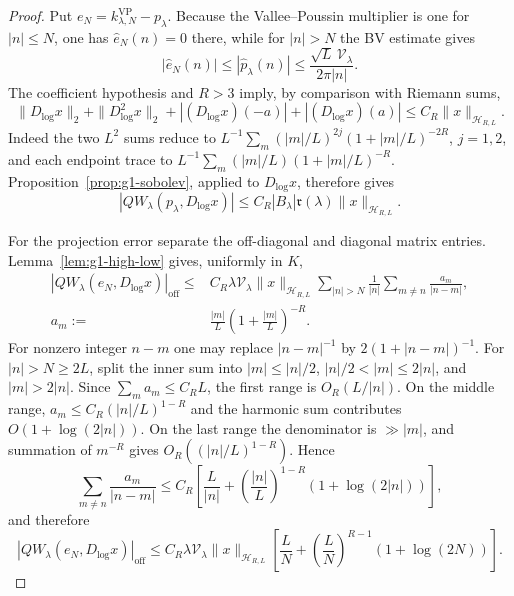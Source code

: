 \documentclass[11pt]{article}
\theoremstyle{remark}
\begin{document}
\begin{proof}
Put $e_N=k^{\mathrm{VP}}_{\lambda,N}-p_\lambda$.  Because the
Vallee--Poussin multiplier is one for $|n|\le N$, one has
$\widehat e_N(n)=0$ there, while for $|n|>N$ the BV estimate gives
\[
 |\widehat e_N(n)|
 \le |\widehat p_\lambda(n)|
 \le \frac{\sqrt L\,\mathcal V_\lambda}{2\pi|n|}.
\]
The coefficient hypothesis and $R>3$ imply, by comparison with Riemann sums,
\[
 \|D_{\log}x\|_2+\|D_{\log}^2x\|_2
 +|(D_{\log}x)(-a)|+|(D_{\log}x)(a)|
 \le C_R\|x\|_{\mathcal H_{R,L}}.
\]
Indeed the two $L^2$ sums reduce to
$L^{-1}\sum_m (|m|/L)^{2j}(1+|m|/L)^{-2R}$, $j=1,2$, and each endpoint
trace to $L^{-1}\sum_m (|m|/L)(1+|m|/L)^{-R}$.
Proposition~\ref{prop:g1-sobolev}, applied to $D_{\log}x$, therefore gives
\[
 |QW_\lambda(p_\lambda,D_{\log}x)|
 \le C_R|B_\lambda|\mathfrak r(\lambda)
       \|x\|_{\mathcal H_{R,L}}.
\]

For the projection error separate the off-diagonal and diagonal matrix
entries.  Lemma~\ref{lem:g1-high-low} gives, uniformly in $K$,
\[
 \begin{split}
 |QW_\lambda(e_N,D_{\log}x)|_{\mathrm{off}}
 \le{}& C_R\lambda\mathcal V_\lambda
 \|x\|_{\mathcal H_{R,L}}
 \sum_{|n|>N}\frac1{|n|}
 \sum_{m\ne n}\frac{a_m}{|n-m|},\\
 a_m:={}&\frac{|m|}{L}
       \left(1+\frac{|m|}{L}\right)^{-R}.
 \end{split}
\]
For nonzero integer $n-m$ one may replace $|n-m|^{-1}$ by
$2(1+|n-m|)^{-1}$.  For $|n|>N\ge2L$, split the inner sum into
$|m|\le|n|/2$, $|n|/2<|m|\le2|n|$, and $|m|>2|n|$.
Since $\sum_m a_m\le C_RL$, the first range is $O_R(L/|n|)$.
On the middle range,
$a_m\le C_R(|n|/L)^{1-R}$ and the harmonic sum contributes
$O(1+\log(2|n|))$.  On the last range the denominator is $\gg|m|$, and
summation of $m^{-R}$ gives $O_R((|n|/L)^{1-R})$.  Hence
\[
 \sum_{m\ne n}\frac{a_m}{|n-m|}
 \le C_R\left[
 \frac{L}{|n|}
 +\left(\frac{|n|}{L}\right)^{1-R}
  (1+\log(2|n|))\right],
\]
and therefore
\begin{equation}\label{eq:g1-weighted-offdiag}
 |QW_\lambda(e_N,D_{\log}x)|_{\mathrm{off}}
 \le C_R\lambda\mathcal V_\lambda\|x\|_{\mathcal H_{R,L}}
 \left[
 \frac{L}{N}
 +\left(\frac{L}{N}\right)^{R-1}(1+\log(2N))\right].
\end{equation}


\end{proof}
\end{document}
